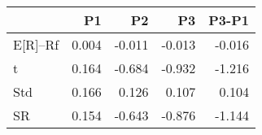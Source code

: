 \begin{tabular}{lrrrr}
\toprule
 & P1 & P2 & P3 & P3-P1 \\
\midrule
E[R]--Rf & 0.004 & -0.011 & -0.013 & -0.016 \\
t & 0.164 & -0.684 & -0.932 & -1.216 \\
Std & 0.166 & 0.126 & 0.107 & 0.104 \\
SR & 0.154 & -0.643 & -0.876 & -1.144 \\
\bottomrule
\end{tabular}
